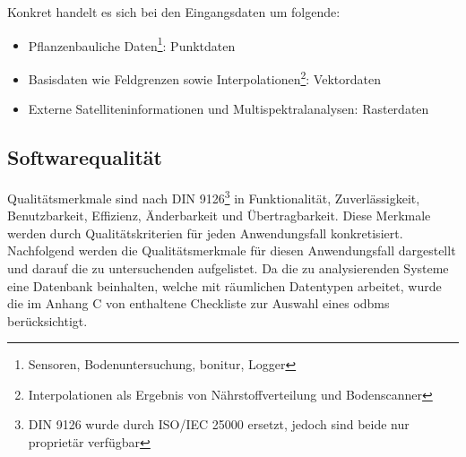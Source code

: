 
\newpage
Konkret handelt es sich bei den Eingangsdaten um folgende:
\begin{itemize}
\item Pflanzenbauliche Daten\footnote{Sensoren, Bodenuntersuchung, \Gls{bonitur}, Logger}: Punktdaten
\item Basisdaten wie Feldgrenzen sowie Interpolationen\footnote{Interpolationen als Ergebnis von Nährstoffverteilung und Bodenscanner}: Vektordaten
\item Externe Satelliteninformationen und Multispektralanalysen: Rasterdaten
\end{itemize}

\subsection{Softwarequalität}
\label{softwarequalität}
Qualitätsmerkmale sind nach DIN 9126\footnote{DIN 9126 wurde durch ISO/IEC 25000 ersetzt, jedoch sind beide nur proprietär verfügbar} in \cite[S.258 f.]{book:lehrbuchsoftware} Funktionalität, Zuverlässigkeit, Benutzbarkeit, Effizienz, Änderbarkeit und Übertragbarkeit.
Diese Merkmale werden durch Qualitätskriterien für jeden Anwendungsfall konkretisiert.
Nachfolgend werden die Qualitätsmerkmale für diesen Anwendungsfall dargestellt und darauf die zu untersuchenden aufgelistet.
Da die zu analysierenden Systeme eine Datenbank beinhalten, welche mit räumlichen Datentypen arbeitet, wurde die im Anhang C von \cite{book:objdbs} enthaltene Checkliste zur Auswahl eines \Gls{odbms} berücksichtigt.

